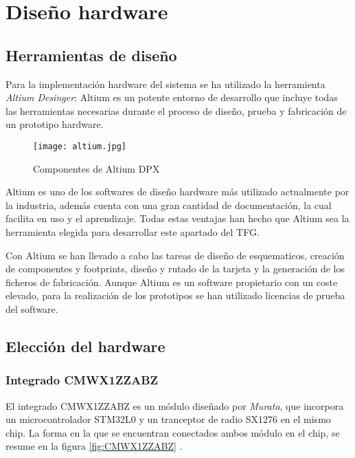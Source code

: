 \chapter{Diseño hardware}
\label{chap:hard}
\graphicspath{{hard/figs/}{hard/figs/}}



\section{Herramientas de diseño}

Para la implementación hardware del sistema se ha utilizado la herramienta \textit{Altium Desinger}: Altium es un potente entorno de desarrollo que incluye todas las herramientas necesarias durante el proceso de diseño, prueba y fabricación de un prototipo hardware.

\begin{figure}[hbt!]
	\centering
	\texttt{[image: altium.jpg]}
	\caption{Componentes de Altium DPX}
	\label{fig::altium}
\end{figure}

Altium es uno de los softwares de diseño hardware más utilizado actualmente por la industria, además cuenta con una gran cantidad de documentación, la cual facilita en uso y el aprendizaje. Todas estas ventajas han hecho que Altium sea la herramienta elegida para desarrollar este apartado del TFG.

Con Altium se han llevado a cabo las tareas de diseño de esquematicos, creación de componentes y footprints, diseño y rutado de la tarjeta y la generación de los ficheros de fabricación. Aunque Altium es un software propietario con un coste elevado, para la realización de los prototipos se han utilizado licencias de prueba del software. 



\section{Elección del hardware}
	\subsection{Integrado CMWX1ZZABZ}
	
	El integrado CMWX1ZZABZ es un módulo diseñado por \textit{Murata}, que incorpora un microcontrolador STM32L0 y un tranceptor de radio SX1276 en el mismo chip. La forma en la que se encuentran conectados ambos módulo en el chip, se resume en la figura  \ref{fig:CMWX1ZZABZ} .
	
